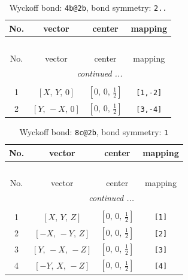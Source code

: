 \documentclass[fleqn,8pt]{jsarticle}
\begin{document}
\begin{longtable}{cccc}
\caption{Wyckoff bond: {\tt 4b@2b}, bond symmetry: {\tt 2..}}
 \\
 \hline \hline
No. & vector & center & mapping \\ \hline \endfirsthead

\multicolumn{3}{l}{\tablename\ \thetable{}} \\
 \hline \hline
No. & vector & center & mapping \\ \hline \endhead

 \hline \hline
\multicolumn{3}{r}{\footnotesize\it continued ...} \\ \endfoot

 \hline \hline
\multicolumn{3}{r}{} \\ \endlastfoot

1 & $\left[ X,\, Y,\, 0 \right]$ & $\left[ 0,\, 0,\, \frac{1}{2} \right]$ & {\tt [1,-2]} \\ \hline
2 & $\left[ Y,\, - X,\, 0 \right]$ & $\left[ 0,\, 0,\, \frac{1}{2} \right]$ & {\tt [3,-4]} \\
\end{longtable}
\renewcommand{\arraystretch}{1.2}
\begin{longtable}{cccc}
\caption{Wyckoff bond: {\tt 8c@2b}, bond symmetry: {\tt 1}}
 \\
 \hline \hline
No. & vector & center & mapping \\ \hline \endfirsthead

\multicolumn{3}{l}{\tablename\ \thetable{}} \\
 \hline \hline
No. & vector & center & mapping \\ \hline \endhead

 \hline \hline
\multicolumn{3}{r}{\footnotesize\it continued ...} \\ \endfoot

 \hline \hline
\multicolumn{3}{r}{} \\ \endlastfoot

1 & $\left[ X,\, Y,\, Z \right]$ & $\left[ 0,\, 0,\, \frac{1}{2} \right]$ & {\tt [1]} \\ \hline
2 & $\left[ - X,\, - Y,\, Z \right]$ & $\left[ 0,\, 0,\, \frac{1}{2} \right]$ & {\tt [2]} \\ \hline
3 & $\left[ Y,\, - X,\, - Z \right]$ & $\left[ 0,\, 0,\, \frac{1}{2} \right]$ & {\tt [3]} \\ \hline
4 & $\left[ - Y,\, X,\, - Z \right]$ & $\left[ 0,\, 0,\, \frac{1}{2} \right]$ & {\tt [4]} \\
\end{longtable}
\end{document}
